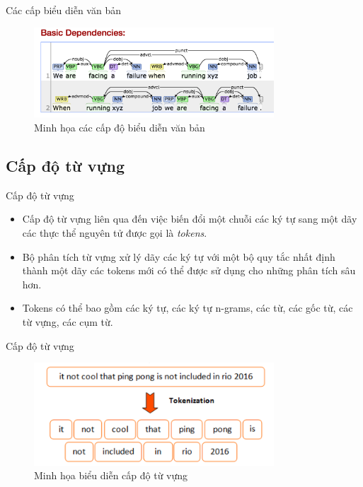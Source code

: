 \documentclass[10pt]{beamer}
\theoremstyle{remark}
\theoremstyle{definition}
\begin{document}
\begin{frame}{Các cấp biểu diễn văn bản}
	\begin{figure}[h!]
        \centering
        \includegraphics[width=0.8\textwidth]{QlGQ3.png}
        \caption{Minh họa các cấp độ biểu diễn văn bản}
        \label{fig:Dependency-Parsing}
    \end{figure}
\end{frame}

\subsection{Cấp độ từ vựng}

\begin{frame}{Cấp độ từ vựng}
	\begin{itemize}
		\item Cấp độ từ vựng liên qua đến việc biến đổi một chuỗi các ký tự sang một dãy các thực thể nguyên tử được gọi là \textit{tokens}.
		\item Bộ phân tích từ vựng xử lý dãy các ký tự với một bộ quy tắc nhất định thành một dãy các tokens mới có thể được sử dụng cho những phân tích sâu hơn.
		\item Tokens có thể bao gồm các ký tự, các ký tự n-grams, các từ, các gốc từ, các từ vựng, các cụm từ.
	\end{itemize}
    
\end{frame}

\begin{frame}{Cấp độ từ vựng}
	\begin{figure}[h!]
        \centering
        \includegraphics[width=0.8\textwidth]{lexical.png}
        \caption{Minh họa biểu diễn cấp độ từ vựng}
        \label{fig:lexical}
    \end{figure}
    
\end{frame}
\end{document}
